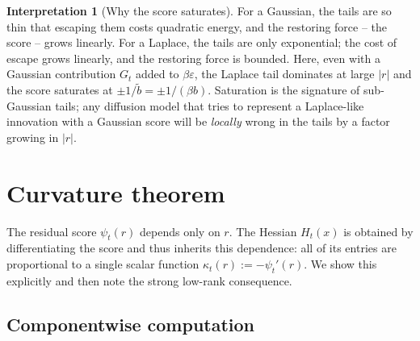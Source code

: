 \documentclass[11pt,a4paper,openany]{book}
\theoremstyle{plainserif}
\theoremstyle{definition}
\theoremstyle{remarkstyle}
\newtheorem*{interpretation}{Interpretation}
\newcommand{\btilde}{\tilde{b}}
\begin{document}
\begin{interpretation}[Why the score saturates]
For a Gaussian, the tails are so thin that escaping them costs quadratic
energy, and the restoring force -- the score -- grows linearly. For a Laplace,
the tails are only exponential; the cost of escape grows linearly, and the
restoring force is bounded. Here, even with a Gaussian contribution $G_t$
added to $\beta\varepsilon$, the Laplace tail dominates at large $|r|$ and the
score saturates at $\pm 1/\btilde = \pm 1/(\beta b)$. Saturation is the
signature of sub-Gaussian tails; any diffusion model that tries to
represent a Laplace-like innovation with a Gaussian score will be
\emph{locally} wrong in the tails by a factor growing in $|r|$.
\end{interpretation}

\chapter{Curvature theorem}
\label{ch:curv}

The residual score $\psi_t(r)$ depends only on $r$. The Hessian $H_t(x)$
is obtained by differentiating the score and thus inherits this
dependence: all of its entries are proportional to a single scalar
function $\kappa_t(r) := -\psi_t'(r)$. We show this explicitly and then
note the strong low-rank consequence.

\section{Componentwise computation}
\end{document}

